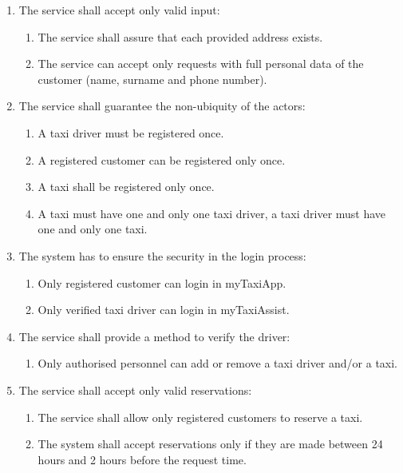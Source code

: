 \begin{enumerate}
	\item The service shall accept only valid input: \begin{enumerate}
		\item The service shall assure that each provided address exists.
		\item The service can accept only requests with full personal data of the customer (name, surname and phone number).
	\end{enumerate}
	
	\item The service shall guarantee the non-ubiquity of the actors: \begin{enumerate}
		\item A taxi driver must be registered once.
		\item A registered customer can be registered only once.
		\item A taxi shall be registered only once.
		\item A taxi must have one and only one taxi driver, a taxi driver must have one and only one taxi.
	\end{enumerate}
	
	\item The system has to ensure the security in the login process: \begin{enumerate}
		\item Only registered customer can login in myTaxiApp.
		\item Only verified taxi driver can login in myTaxiAssist.
	\end{enumerate}
	
	\item The service shall provide a method to verify the driver: \begin{enumerate}
		\item Only authorised personnel can add or remove a taxi driver and/or a taxi.
	\end{enumerate}
	
	\item The service shall accept only valid reservations: \begin{enumerate}
		\item The service shall allow only registered customers to reserve a taxi.
		\item The system shall accept reservations only if they are made between 24 hours and 2 hours before the request time.
	\end{enumerate}
	

\end{enumerate}
